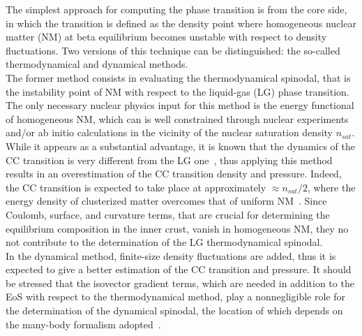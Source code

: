 The simplest approach for computing the phase transition is from the core side, 
in which the transition is defined as the density point where homogeneous 
nuclear matter (NM) at beta equilibrium becomes unstable with respect to 
density fluctuations. Two versions of this technique can be distinguished: the 
so-called thermodynamical \cite{Gonzalez2017} and 
dynamical \cite{Pethick1995cc,Antic2019} methods.\\
The former method consists in evaluating the thermodynamical spinodal, that is 
the instability point of NM with respect to the liquid-gas (LG) phase 
transition. The only necessary nuclear physics input for this method is the 
energy functional of homogeneous NM, which can is well constrained through
nuclear experiments and/or ab initio calculations in the vicinity of the
nuclear saturation density $n_{sat}$. While it appears as a substantial 
advantage, it is known that the dynamics of the CC transition is very different 
from the LG one~\cite{Ducoin2007a,Ducoin2007b,Ducoin2008}, thus applying this 
method results in an overestimation of the 
CC transition density and pressure. Indeed, the CC transition is expected 
to take place at approximately $\approx n_{sat}/2$, where the energy density of 
clusterized matter overcomes that of uniform NM~\cite{BBP}. Since Coulomb, surface,
and curvature terms, that are crucial for determining the equilibrium
composition in the inner crust, vanish in homogeneous NM, they no not 
contribute to the determination of the LG thermodynamical spinodal.\\
In the dynamical method, finite-size density fluctuations are added, thus 
it is expected to give a better estimation of the CC transition and pressure. 
It should be stressed that the isovector gradient terms, which are needed in
addition to the EoS with respect to the thermodynamical method, play a 
nonnegligible role for the determination of the dynamical spinodal, the
location of which depends on the many-body formalism adopted~\cite{Ducoin2008}.

